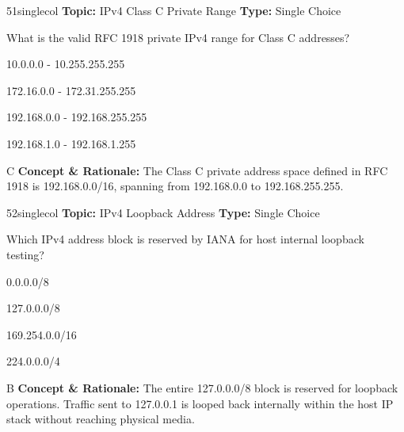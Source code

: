 \begin{qcard}{51}{singlecol}
\textcolor{darkslate!75}{\small\textbf{Topic:} IPv4 Class C Private Range \hfill \textbf{Type:} Single Choice}\vspace{0.4em}\par
What is the valid RFC 1918 private IPv4 range for Class C addresses?
\begin{qoptions}
\item 10.0.0.0 - 10.255.255.255
\item 172.16.0.0 - 172.31.255.255
\item 192.168.0.0 - 192.168.255.255
\item 192.168.1.0 - 192.168.1.255
\end{qoptions}
\end{qcard}
\nopagebreak
\begin{explainbox}{C}
\textbf{Concept \& Rationale:} The Class C private address space defined in RFC 1918 is 192.168.0.0/16, spanning from 192.168.0.0 to 192.168.255.255.
\end{explainbox}

\begin{qcard}{52}{singlecol}
\textcolor{darkslate!75}{\small\textbf{Topic:} IPv4 Loopback Address \hfill \textbf{Type:} Single Choice}\vspace{0.4em}\par
Which IPv4 address block is reserved by IANA for host internal loopback testing?
\begin{qoptions}
\item 0.0.0.0/8
\item 127.0.0.0/8
\item 169.254.0.0/16
\item 224.0.0.0/4
\end{qoptions}
\end{qcard}
\nopagebreak
\begin{explainbox}{B}
\textbf{Concept \& Rationale:} The entire 127.0.0.0/8 block is reserved for loopback operations. Traffic sent to 127.0.0.1 is looped back internally within the host IP stack without reaching physical media.
\end{explainbox}

